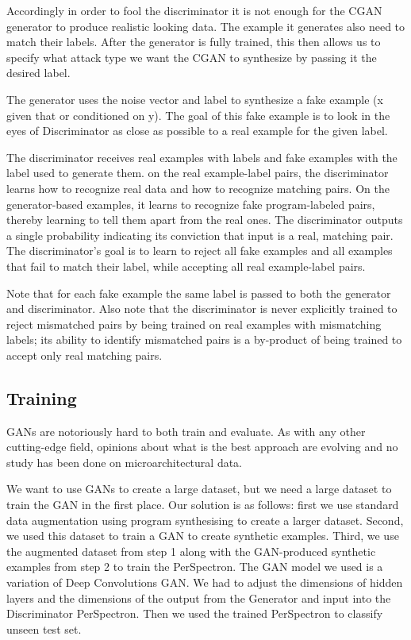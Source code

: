  Accordingly in order to fool the discriminator it is not enough for the CGAN generator to produce realistic looking data. The example it generates also need to match their labels. After the generator is fully trained, this then allows us to specify what attack type we want the CGAN to synthesize by passing it the desired label. 
 
 The generator uses the noise vector and label to synthesize a fake example (x given that or conditioned on y). The goal of this fake example is to look in the eyes of Discriminator as close as possible to a real example for the given label.  
 
 
 
 The discriminator receives real examples with labels and fake examples with the label used to generate them. on the real example-label pairs, the discriminator learns how to recognize real data and how to recognize matching pairs. On the generator-based examples, it learns to recognize fake program-labeled pairs, thereby learning to tell them apart from the real ones. The discriminator outputs a single probability indicating its conviction that input is a real, matching pair. The discriminator's goal is to learn to reject all fake examples and all examples that fail to match their label, while accepting all real example-label pairs. 
 
 Note that for each fake example the same label is passed to both the generator and discriminator. Also note that the discriminator is never explicitly trained to reject mismatched pairs by being trained on real examples with mismatching labels; its ability to identify mismatched pairs is a by-product of being trained to accept only real matching pairs. 
 

\subsection{Training}
GANs are notoriously hard to both train and evaluate. As with any other cutting-edge field, opinions about what is the best approach are evolving and no study has been done on microarchitectural data. 

We want to use GANs to create a large dataset, but we need a large dataset to train the GAN in the first place. 
Our solution is as follows:
first we use standard data augmentation using program synthesising to create a larger dataset. Second, we used this dataset to train a GAN to create synthetic examples. Third, we use the augmented dataset from step 1 along with the GAN-produced synthetic examples from step 2 to train the PerSpectron. The GAN model we used is a variation of Deep Convolutions GAN. We had to adjust the dimensions of hidden layers and the dimensions of the output from the Generator and input into the Discriminator PerSpectron. Then we used the trained PerSpectron to classify unseen test set.  

